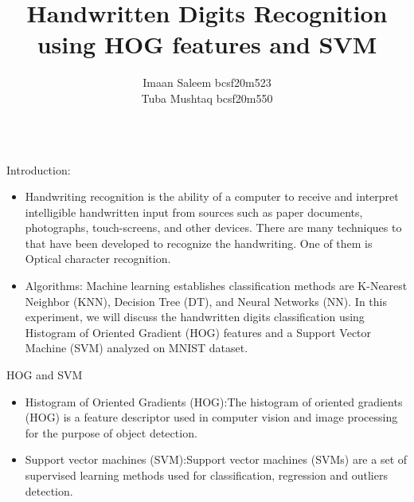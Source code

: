 \documentclass[8pt,final,hyperref={pdfpagelabels=false}]{beamer}
\title{\huge Handwritten Digits Recognition using HOG features and SVM} %
\author{Imaan Saleem bcsf20m523  \texorpdfstring{\\}{} Tuba Mushtaq bcsf20m550} %
\institute{Faculty of Computing and Information Technology} %
\theoremstyle{plain}
\begin{document}

\begin{frame} %

\begin{columns}[t] %

\begin{column}{.23\textwidth} %
                
    \begin{block}{Introduction:}
        \begin{itemize}
            \item
            Handwriting recognition is the ability of a computer to receive and
interpret intelligible handwritten input from sources such as paper
documents, photographs, touch-screens, and other devices. There
are many techniques to that have been developed to recognize the
handwriting. One of them is Optical character recognition. 
            
            \item Algorithms:
Machine learning establishes classification methods are K-Nearest Neighbor (KNN), Decision Tree (DT), and Neural Networks (NN). In this experiment, we will discuss the handwritten digits classification using Histogram of Oriented Gradient (HOG) features and a Support Vector Machine (SVM) analyzed on MNIST dataset.
        \end{itemize}
    \end{block}
    
    \begin{block}{HOG and SVM}
        \begin{itemize}
            \item Histogram of Oriented Gradients (HOG):The histogram of oriented gradients (HOG) is a feature descriptor used in computer vision and image processing for the purpose of object detection.
            
            \item Support vector machines (SVM):Support vector machines (SVMs) are a set of supervised learning methods used for classification, regression and outliers detection.


\end{itemize}
\end{block}
\end{column}
\end{columns}
\end{frame}
\end{document}
